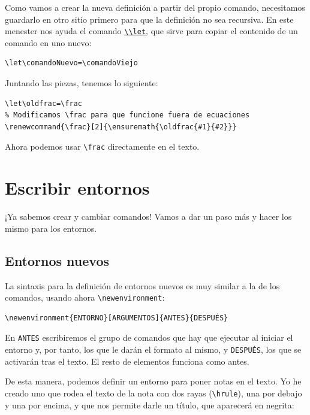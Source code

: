 Como vamos a crear la nueva definición a partir del propio comando,
necesitamos guardarlo en otro sitio primero para que la definición no
sea recursiva. En este menester nos ayuda el comando
\href{https://en.wikibooks.org/wiki/TeX/let}{\lstinline!\\let!}, que
sirve para copiar el contenido de un comando en uno nuevo:

\begin{lstlisting}[language={[latex]tex}]
\let\comandoNuevo=\comandoViejo
\end{lstlisting}

Juntando las piezas, tenemos lo siguiente:

\begin{lstlisting}[language={[latex]tex}]
% Guardamos la definición original
\let\oldfrac=\frac
% Modificamos \frac para que funcione fuera de ecuaciones
\renewcommand{\frac}[2]{\ensuremath{\oldfrac{#1}{#2}}}
\end{lstlisting}

Ahora podemos usar \lstinline!\frac! directamente en el texto.

\section{Escribir entornos}

¡Ya sabemos crear y cambiar comandos! Vamos a dar un paso más y hacer
los mismo para los entornos.

\subsection{Entornos nuevos}

La sintaxis para la definición de entornos nuevos es muy similar a la de
los comandos, usando ahora \lstinline!\newenvironment!:

\begin{lstlisting}[language={[latex]tex}]
\newenvironment{ENTORNO}[ARGUMENTOS]{ANTES}{DESPUÉS}
\end{lstlisting}

En \lstinline!ANTES! escribiremos el grupo de comandos que hay que
ejecutar al iniciar el entorno y, por tanto, los que le darán el formato
al mismo, y \lstinline!DESPUÉS!, los que se activarán tras el texto. El
resto de elementos funciona como antes.

De esta manera, podemos definir un entorno para poner notas en el texto.
Yo he creado uno que rodea el texto de la nota con dos rayas
(\lstinline!\hrule!), una por debajo y una por encima, y que nos permite
darle un título, que aparecerá en negrita:

